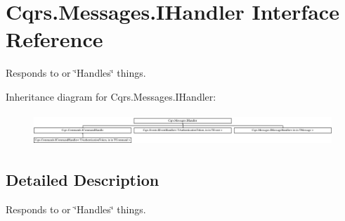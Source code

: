 \hypertarget{interfaceCqrs_1_1Messages_1_1IHandler}{}\section{Cqrs.\+Messages.\+I\+Handler Interface Reference}
\label{interfaceCqrs_1_1Messages_1_1IHandler}


Responds to or \char`\"{}\+Handles\char`\"{} things.  


Inheritance diagram for Cqrs.\+Messages.\+I\+Handler\+:\begin{figure}[H]
\begin{center}
\leavevmode
\includegraphics[height=1.206897cm]{interfaceCqrs_1_1Messages_1_1IHandler}
\end{center}
\end{figure}


\subsection{Detailed Description}
Responds to or \char`\"{}\+Handles\char`\"{} things. 

